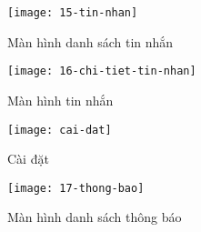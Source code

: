 \documentclass[../Thesis.tex]{subfiles}
\begin{document}
    \begin{figure}[ht!]
        \centering\texttt{[image: 15-tin-nhan]}
        \caption{Màn hình danh sách tin nhắn}
        \label{fig:danh-sach-tin-nhan}
    \end{figure}

    \begin{figure}[ht!]
        \centering\texttt{[image: 16-chi-tiet-tin-nhan]}
        \caption{Màn hình tin nhắn}
        \label{fig:tin-nhan}
    \end{figure}

    \begin{figure}[ht!]
        \centering\texttt{[image: cai-dat]}
        \caption{Cài đặt}
        \label{fig:cai-cat}
    \end{figure}

    \begin{figure}[ht!]
        \centering\texttt{[image: 17-thong-bao]}
        \caption{Màn hình danh sách thông báo}
        \label{fig:tao-thong-bao}
    \end{figure}
\end{document}
